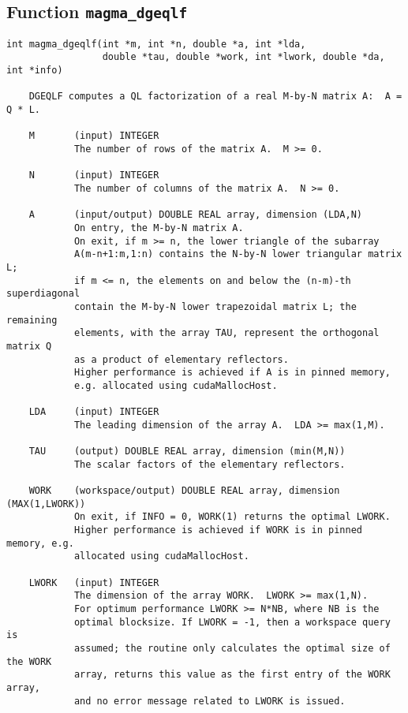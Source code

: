 \documentclass[10pt]{book}
\begin{document}
\newpage
\subsection{Function {\tt {\bf magma\_dgeqlf}}}
\begin{verbatim}
int magma_dgeqlf(int *m, int *n, double *a, int *lda,
                 double *tau, double *work, int *lwork, double *da, int *info)

    DGEQLF computes a QL factorization of a real M-by-N matrix A:  A = Q * L.

    M       (input) INTEGER
            The number of rows of the matrix A.  M >= 0.

    N       (input) INTEGER
            The number of columns of the matrix A.  N >= 0.

    A       (input/output) DOUBLE REAL array, dimension (LDA,N)
            On entry, the M-by-N matrix A.
            On exit, if m >= n, the lower triangle of the subarray
            A(m-n+1:m,1:n) contains the N-by-N lower triangular matrix L;
            if m <= n, the elements on and below the (n-m)-th superdiagonal 
            contain the M-by-N lower trapezoidal matrix L; the remaining 
            elements, with the array TAU, represent the orthogonal matrix Q 
            as a product of elementary reflectors. 
            Higher performance is achieved if A is in pinned memory, 
            e.g. allocated using cudaMallocHost.

    LDA     (input) INTEGER
            The leading dimension of the array A.  LDA >= max(1,M).

    TAU     (output) DOUBLE REAL array, dimension (min(M,N))
            The scalar factors of the elementary reflectors.

    WORK    (workspace/output) DOUBLE REAL array, dimension (MAX(1,LWORK))
            On exit, if INFO = 0, WORK(1) returns the optimal LWORK.
            Higher performance is achieved if WORK is in pinned memory, e.g.
            allocated using cudaMallocHost.

    LWORK   (input) INTEGER
            The dimension of the array WORK.  LWORK >= max(1,N).
            For optimum performance LWORK >= N*NB, where NB is the
            optimal blocksize. If LWORK = -1, then a workspace query is 
            assumed; the routine only calculates the optimal size of the WORK 
            array, returns this value as the first entry of the WORK array, 
            and no error message related to LWORK is issued.


\end{verbatim}
\end{document}
